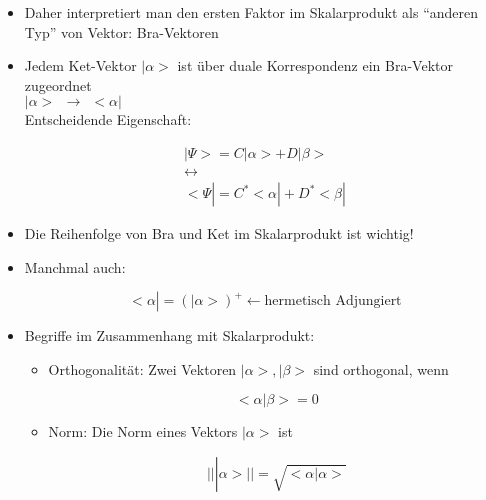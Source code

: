 \documentclass[10pt,article,colorback,accentcolor=tud9d]{scrartcl}
\begin{document}
\begin{itemize}
\begin{fleqn}
\begin{itemize}
\begin{equation}
\end{equation}
\end{itemize}
\end{fleqn}
\item Daher interpretiert man den ersten Faktor im Skalarprodukt als "`anderen Typ"' von Vektor: Bra-Vektoren
\item Jedem Ket-Vektor $\left|\right.\alpha>$ ist über duale Korrespondenz ein Bra-Vektor zugeordnet\\
$\left|\right.\alpha> \ \ \rightarrow \ \ <\alpha\left|\right.$\\
Entscheidende Eigenschaft:
\begin{fleqn}
\begin{equation}
\begin{aligned}
\left|\right.\Psi> = C \left|\right.\alpha> +D\left|\right.\beta>\\
\longleftrightarrow\\
<\Psi\left|\right.=C^*<\alpha\left|\right. +D^* <\beta\left|\right.
\end{aligned}
\end{equation}
\end{fleqn}
\item Die Reihenfolge von Bra und Ket im Skalarprodukt ist wichtig!
\item Manchmal auch:
\begin{fleqn}
\begin{equation}
<\alpha\left|\right.=(\left|\right.\alpha>)^+ \leftarrow \text{hermetisch Adjungiert}
\end{equation}
\end{fleqn}
\item Begriffe im Zusammenhang mit Skalarprodukt:
\begin{itemize}
\item Orthogonalität: Zwei Vektoren $\left|\right.\alpha>, \left|\right.\beta>$ sind orthogonal, wenn
\begin{fleqn}
\begin{equation}
<\alpha\left|\right.\beta>=0
\end{equation}
\end{fleqn}
\item Norm: Die Norm eines Vektors $\left|\right.\alpha>$ ist 
\begin{fleqn}
\begin{equation}
\left|\right|\left|\right.\alpha>\left|\right|=\sqrt{<\alpha\left|\right.\alpha>}
\end{equation}
\end{fleqn}

\end{itemize}
\end{itemize}
\end{document}
